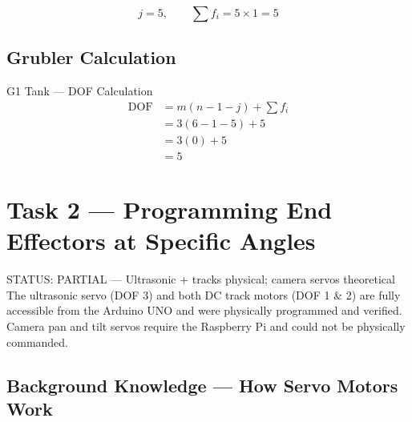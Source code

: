 \documentclass[12pt,a4paper]{article}
\begin{document}
\[
  \boxed{j = 5}, \qquad \boxed{\sum f_i = 5 \times 1 = 5}
\]

\subsection{Grubler Calculation}

\begin{mathbox}{G1 Tank --- DOF Calculation}
\begin{align*}
  \mathrm{DOF} &= m(n - 1 - j) + \sum f_i \\[6pt]
               &= 3(6 - 1 - 5) + 5 \\[6pt]
               &= 3(0) + 5 \\[6pt]
               &= \boxed{5}
\end{align*}
\end{mathbox}

\newpage
\section{Task 2 --- Programming End Effectors at Specific Angles}

\begin{warnbox}{STATUS: PARTIAL --- Ultrasonic + tracks physical; camera servos theoretical}
The ultrasonic servo (DOF 3) and both DC track motors (DOF 1 \& 2) are fully
accessible from the Arduino UNO and were physically programmed and verified.
Camera pan and tilt servos require the Raspberry Pi and could not be physically
commanded.
\end{warnbox}

\subsection{Background Knowledge --- How Servo Motors Work}
\end{document}
